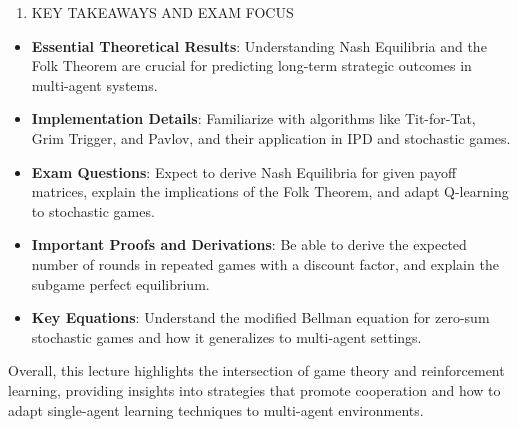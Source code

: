 \documentclass[
  12pt,
]{report}
\providecommand{\tightlist}{%
  \setlength{\itemsep}{0pt}\setlength{\parskip}{0pt}}
\begin{document}
\begin{enumerate}
\def\labelenumi{\arabic{enumi}.}
\setcounter{enumi}{3}
\tightlist
\item
  KEY TAKEAWAYS AND EXAM FOCUS
\end{enumerate}

\begin{itemize}
\item
  \textbf{Essential Theoretical Results}: Understanding Nash Equilibria and the Folk Theorem are crucial for predicting long-term strategic outcomes in multi-agent systems.
\item
  \textbf{Implementation Details}: Familiarize with algorithms like Tit-for-Tat, Grim Trigger, and Pavlov, and their application in IPD and stochastic games.
\item
  \textbf{Exam Questions}: Expect to derive Nash Equilibria for given payoff matrices, explain the implications of the Folk Theorem, and adapt Q-learning to stochastic games.
\item
  \textbf{Important Proofs and Derivations}: Be able to derive the expected number of rounds in repeated games with a discount factor, and explain the subgame perfect equilibrium.
\item
  \textbf{Key Equations}: Understand the modified Bellman equation for zero-sum stochastic games and how it generalizes to multi-agent settings.
\end{itemize}

Overall, this lecture highlights the intersection of game theory and reinforcement learning, providing insights into strategies that promote cooperation and how to adapt single-agent learning techniques to multi-agent environments.
\end{document}
